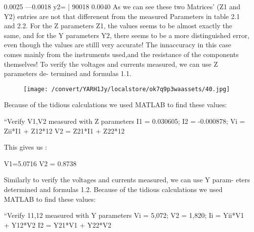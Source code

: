 \documentclass[12pt]{report}
\begin{document}
    0.0025 —0.0018    y2= | 90018 0.0040    As we can see these two Matrices’ (Z1 and Y2) entries are not that differenent  from the measured Parameters in table 2.1 and 2.2. For the Z parameters Z1,  the values seems to be almost exactly the same, and for the Y parameters  Y2, there seems to be a more distinguished error, even though the values  are stilll very accurate! The innaccuracy in this case comes mainly from the  instruments used,and the resistance of the components themselves!   To verify the voltages and currents measured, we can use Z parameters de-  termined and formulas 1.1. 

\vspace{10pt}

\begin{figure}[h]

\texttt{[image: /convert/YARH1Jy/localstore/ok7q9p3waassets/40.jpg]}

\centering

\end{figure}

\par

\vspace{10pt}

    Because of the tidious calculations we used MATLAB to find these values: 

\vspace{10pt}

    “Verify V1,V2 measured with Z parameters  I1 = 0.030605;   I2 = -0.000878;   Vi = Zii*I1 + Z12*12   V2 = Z21*I1 + Z22*12 

\vspace{10pt}

    This gives us : 

\vspace{10pt}

    V1=5.0716 V2 = 0.8738 

\vspace{10pt}

    Similarly to verify the voltages and currents measured, we can use Y param-  eters determined and formulas 1.2. Because of the tidious calculations we  used MATLAB to find these values: 

\vspace{10pt}

    “Verify 11,12 measured with Y parameters  Vi = 5,072;   V2 = 1,820;   Ii = Yii*V1 + Y12*V2   I2 = Y21*V1 + Y22*V2 

\vspace{10pt}
\end{document}
